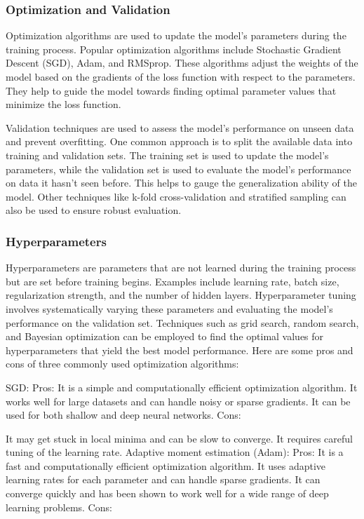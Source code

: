 \subsubsection{Optimization and Validation}
Optimization algorithms are used to update the model's parameters during the training process. Popular optimization algorithms include Stochastic Gradient Descent (SGD), Adam, and RMSprop. These algorithms adjust the weights of the model based on the gradients of the loss function with respect to the parameters. They help to guide the model towards finding optimal parameter values that minimize the loss function.

Validation techniques are used to assess the model's performance on unseen data and prevent overfitting. One common approach is to split the available data into training and validation sets. The training set is used to update the model's parameters, while the validation set is used to evaluate the model's performance on data it hasn't seen before. This helps to gauge the generalization ability of the model. Other techniques like k-fold cross-validation and stratified sampling can also be used to ensure robust evaluation.

\subsubsection{Hyperparameters}
Hyperparameters are parameters that are not learned during the training process but are set before training begins. Examples include learning rate, batch size, regularization strength, and the number of hidden layers. Hyperparameter tuning involves systematically varying these parameters and evaluating the model's performance on the validation set. Techniques such as grid search, random search, and Bayesian optimization can be employed to find the optimal values for hyperparameters that yield the best model performance.
Here are some pros and cons of three commonly used optimization algorithms:

\ac{SGD}:
Pros:
It is a simple and computationally efficient optimization algorithm.
It works well for large datasets and can handle noisy or sparse gradients.
It can be used for both shallow and deep neural networks.
Cons:

It may get stuck in local minima and can be slow to converge.
It requires careful tuning of the learning rate.
Adaptive moment estimation (Adam):
Pros:
It is a fast and computationally efficient optimization algorithm.
It uses adaptive learning rates for each parameter and can handle sparse gradients.
It can converge quickly and has been shown to work well for a wide range of deep learning problems.
Cons:

